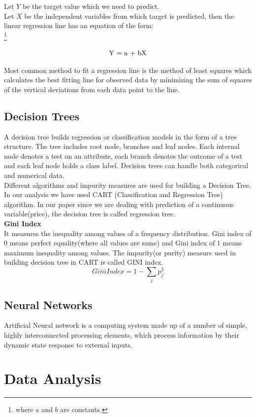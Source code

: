 \documentclass[fleqn,10pt]{SelfArx} %
\begin{document}
	Let $Y$ be the target value which we need to predict.\\
	
	Let $X$ be the independent variables from which target is predicted, then the linear regression line has an equation of the form:\\
	\footnote{where $a$ and $b$ are constants.}\centerline{\[ $Y = a + bX$\]}	
	
	
	Most common method to fit a regression line is the method of least squares which calculates the best fitting line for observed data by minimizing the sum of squares of the vertical deviations from each data point to the line. 
	
	\subsection{Decision Trees}
	A decision tree builds regression or classification models in the form of a tree structure. The tree includes root node, branches and leaf nodes. Each internal node denotes a test on an attribute, each branch denotes the outcome of a test and each leaf node holds a class label. Decision trees can handle both categorical and numerical data. \\
	Different algorithms and impurity measures are used for building a Decision Tree. In our analysis we have used CART (Classification and Regression Tree) algorithm. In our paper since we are dealing with prediction of a continuous  variable(price), the decision tree is called regression tree.\\
	\textbf{Gini Index}\\
	It measures the inequality among values of a frequency distribution. Gini index of 0 means perfect equality(where all values are same) and Gini index of 1 means maximum inequality among values. The impurity(or purity) measure used in building decision tree in CART is called GINI index.
	\[Gini Index = 1 - \sum_{j}p_j^2 \]
	
	\subsection{Neural Networks}
	Artificial Neural network is a computing system made up of a number of simple, highly interconnected processing elements, which process information by their dynamic state response to external inputs.
	
	\section{Data Analysis}
	
\end{document}
